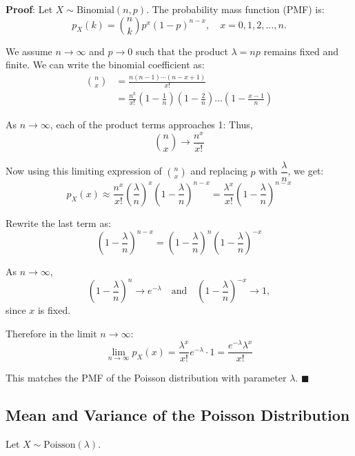 \documentclass[twoside]{book}
\begin{document}
\textbf{Proof}: Let \( X \sim \text{Binomial}(n, p) \). The probability mass function (PMF) is:
\[
p_X(k) = \binom{n}{k} p^x (1 - p)^{n-x}, \quad x = 0, 1, 2, \ldots, n.
\]

We assume \( n \to \infty \) and \( p \to 0 \) such that the product \( \lambda = np \) remains fixed and finite. We can write the binomial coefficient as:
\begin{align*}
    \binom{n}{x} &= \frac{n (n-1) \cdots (n-x+1)}{x!} \\
    &= \frac{n^k}{x!} \left(1 - \frac{1}{n}\right)\left(1 - \frac{2}{n}\right) \dots \left(1 - \frac{x-1}{n}\right)
\end{align*}

As \( n \to \infty \), each of the product terms approaches 1:
Thus,
\[
\binom{n}{x} \to \frac{n^x}{x!}
\]

Now using this limiting expression of $\binom{n}{x}$ and replacing \( p \) with \( \dfrac{\lambda}{n} \), we get:
\[
p_X(x) \approx \frac{n^x}{x!} \left(\frac{\lambda}{n}\right)^x \left(1 - \frac{\lambda}{n}\right)^{n-x} = \frac{\lambda^x}{x!} \left(1 - \frac{\lambda}{n}\right)^{n-x}
\]

Rewrite the last term as:
\[
\left(1 - \frac{\lambda}{n}\right)^{n-x} = \left(1 - \frac{\lambda}{n}\right)^n \left(1 - \frac{\lambda}{n}\right)^{-x}
\]

As \( n \to \infty \), 
\[
\left(1 - \frac{\lambda}{n}\right)^n \to e^{-\lambda}
\quad \text{and} \quad
\left(1 - \frac{\lambda}{n}\right)^{-x} \to 1,
\]
since \( x \) is fixed.


Therefore in the limit \( n \to \infty \):
\[
\lim_{n \to \infty} p_X(x) = \frac{\lambda^x}{x!} e^{-\lambda} \cdot 1 = \frac{e^{-\lambda} \lambda^x}{x!}
\]

This matches the PMF of the Poisson distribution with parameter \( \lambda \).
\hfill\(\blacksquare\)

\subsection{Mean and Variance of the Poisson Distribution}

Let $X \sim \text{Poisson}(\lambda)$.
\end{document}
